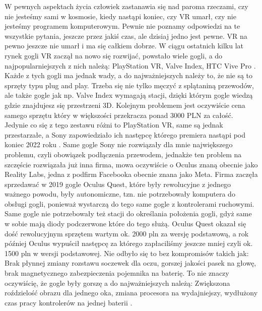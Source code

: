 \documentclass[a4paper,12pt,reqno]{article}
\begin{document}
W pewnych aspektach życia człowiek zastanawia się nad paroma rzeczami, czy nie
jesteśmy sami w kosmosie, kiedy nastąpi koniec, czy VR umarł, czy nie jesteśmy
programem komputerowym. Pewnie nie poznamy odpowiedzi na te wszystkie
pytania, jeszcze przez jakiś czas, ale dzisiaj jedno jest pewne. VR na pewno jeszcze
nie umarł i ma się całkiem dobrze. W ciągu ostatnich kilku lat rynek gogli VR zaczął
na nowo się rozwijać, powstało wiele gogli, a do najpopularniejszych z nich należą:
PlayStation VR, Valve Index, HTC Vive Pro \cite{popularnosc_gogli}. Każde z tych gogli ma jednak wady, a
do najważniejszych należy to, że nie są to sprzęty typu plug and play. Trzeba się nie
tylko męczyć z splątaniną przewodów, ale także gogle jak np. Valve Index wymagają
stacji, dzięki którym gogle wiedzą gdzie znajdujesz się przestrzeni 3D. Kolejnym
problemem jest oczywiście cena samego sprzętu który w większości przekracza
ponad 3000 PLN za całość. Jedynie co się z tego zestawu różni to PlayStation VR,
same są jednak przestarzałe, a Sony zapowiedziało ich następcę którego premiera
nastąpi pod koniec 2022 roku \cite{PlayStation_VR2}. Same gogle Sony nie rozwiązały dla mnie
największego problemu, czyli obowiązek podłączenia przewodem, jednakże ten
problem na szczęście rozwiązała już inna firma, mowa oczywiście o Oculus znaną
obecnie jako Reality Labs, jedna z podfirm Facebooka obecnie znana jako Meta. Firma zaczęła
sprzedawać w 2019 gogle Oculus Quest, które były rewolucyjne z jednego ważnego
powodu, były autonomiczne, tzn. nie potrzebowały komputera do obsługi gogli,
ponieważ wystarczą do tego same gogle z kontrolerami ruchowymi. Same gogle nie
potrzebowały też stacji do określania położenia gogli, gdyż same w sobie mają diody
podczerwone które do tego służą. Oculus Quest okazał się dość rewolucyjnym
sprzętem wartym ok. 2000 pln za wersję podstawową, a rok później Oculus wypuścił
następcę za którego zapłaciliśmy jeszcze mniej czyli ok. 1500 pln w wersji
podstawowej. Nie odbyło się to bez kompromisów takich jak: Brak płynnej zmiany
rozstawu soczewek dla oczu, gorszej jakości pasek na głowę, brak magnetycznego
zabezpieczenia pojemnika na baterię. To nie znaczy oczywiścię, że gogle były
gorszę a do najważniejszych należą: Zwiększona roździelość obrazu dla jednego
oka, zmiana procesora na wydajniejszy, wydłużony czas pracy kontrolerów na jednej
baterii \cite{porownanie_gogli}. 
\end{document}
